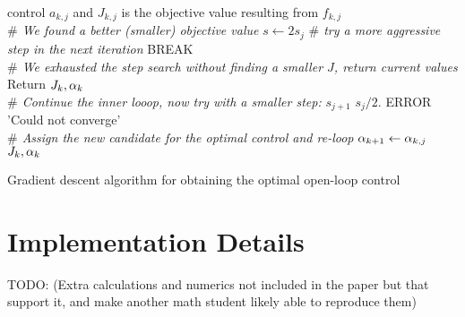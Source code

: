 \begin{algorithm}
\begin{algorithmic}
{	control $a_{k,j}$ and $J_{k,j}$ is the objective value resulting from
	$f_{k,j}$}
		\\ {\itshape $\#$ We found a better (smaller) objective value}
		\State $s \gets 2 s_j$ {\itshape $\#$ try a more aggressive step in the
		next iteration}
		\State BREAK
		\EndIf
		\\ {\itshape $\#$ We exhausted the step search without finding a 
		smaller $J$, return current values}
		\State Return $J_k, \alpha_k$
	\EndIf
 	\\ {\itshape  $ \#$ Continue the inner looop, now try with a smaller step:}
	 	\State $s_{j+1}$ \gets $s_j / 2.$
		\State ERROR 'Could not converge'
	\EndIf
    \\{\itshape $\#$ Assign the new candidate for the optimal control and
    re-loop}
		\State $\alpha_{k+1} \gets \alpha_{k,j}$
\State \Return $J_k, \alpha_k$
\end{algorithmic}
\caption{ Gradient descent algorithm for obtaining the optimal open-loop 
control}
\label{alg:gradient_descent_4_OC}
\end{algorithm}



\section{Implementation Details}
TODO: (Extra calculations and numerics not included in the paper but that
support it, and make another math  student likely able to reproduce them)
